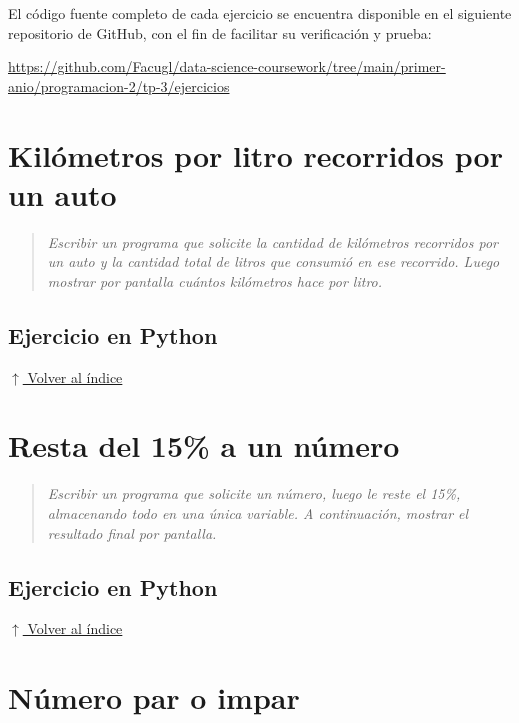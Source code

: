 \documentclass[12pt]{article}
\newcommand{\codigopython}[2]{%
}
\newcommand{\volverindice}{%
    \vspace{1em}%
    \begin{flushright}%
        \hyperlink{indice}{\small $\uparrow$ Volver al índice}%
    \end{flushright}%
}
\newcommand{\enunciado}[1]{%
    \begin{quote}
        \itshape #1
    \end{quote}
}
\begin{document}
El código fuente completo de cada ejercicio se encuentra disponible en el siguiente repositorio de GitHub, con el fin de facilitar su verificación y prueba:

\begin{center}
    \url{https://github.com/Facugl/data-science-coursework/tree/main/primer-anio/programacion-2/tp-3/ejercicios}
\end{center}


\newpage
\section{Kilómetros por litro recorridos por un auto}

\enunciado{Escribir un programa que solicite la cantidad de kilómetros recorridos por un auto y la cantidad total de litros que consumió en ese recorrido. Luego mostrar por pantalla cuántos kilómetros hace por litro.}

\subsection*{Ejercicio en Python}

\codigopython{01}{Kilómetros por litro recorridos por un auto}

\volverindice
\newpage


\section{Resta del 15\% a un número}

\enunciado{Escribir un programa que solicite un número, luego le reste el 15\%, almacenando todo en una única variable. A continuación, mostrar el resultado final por pantalla.}

\subsection*{Ejercicio en Python}

\codigopython{02}{Resta del 15\% a un número}

\volverindice
\newpage


\section{Número par o impar}
\end{document}
